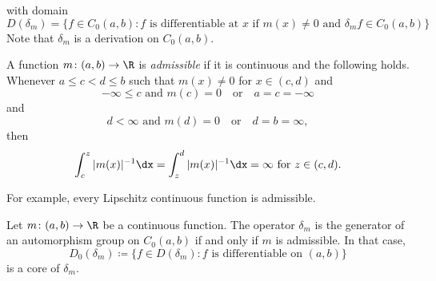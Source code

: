 with domain  
\[
D(\delta_{m}) = \{ f \in C_{0}(a,b) \colon f \text{ is differentiable at } x \text{ if } m(x) \neq 0 \text{ and } \delta_{m}f \in C_{0}(a,b) \}
\]
Note that $\delta_{m}$ is a derivation on $C_{0}(a,b)$.
\begin{definition}\label{def:b2-3.16}
%
A function $m \colon (a,b) \to \R$ is \emph{admissible} if it is continuous and the following holds.
Whenever $a \leq c < d \leq b$ such that $m(x) \neq 0$ for $x \in (c,d)$ and 
\[
 -\infty \leq c \text{ and } m(c) = 0
\quad \text{or} \quad
a = c = -\infty
\]
and
\[
d < \infty \text{ and } m(d) = 0
\quad \text{or} \quad
d = b = \infty, 
\]
then
\begin{equation*}\label{eq:b2-3.16-KGK.1}
\int_{c}^{z} |m(x)|^{-1} \dx = \int_{z}^{d} |m(x)|^{-1} \dx 
	= \infty \text{ for } z \in (c,d).
\end{equation*}
\end{definition}
For example, every Lipschitz continuous function is admissible.
%
\begin{theorem}\label{thm:b2-3.17}
Let $m \colon (a,b) \to \R$ be a continuous function. The operator $\delta_{m}$
is the generator of an automorphism group on $C_{0}(a,b)$ if and only if\/ $m$
is admissible. In that case,
\[
    D_{0}(\delta_{m}) \coloneqq \{ f \in D(\delta_{m}) : f \text{ is differentiable on } (a,b)\}
\]
is a core of\/ $\delta_{m}$.
\end{theorem}
